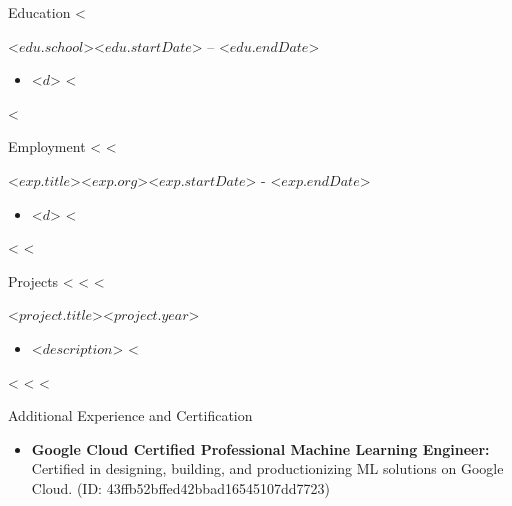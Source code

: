 \documentclass[]{mcdowellcv}
\begin{document}
	\makeheader
	

	\begin{cvsection}{Education}
		<%
		\begin{cvsubsection}{<$ edu.school $>}{}{<$ edu.startDate $> -- <$ edu.endDate $>}
			\begin{itemize}
					<%
				\item <$ d $>
					<%
			\end{itemize}
		\end{cvsubsection}
		<%
	\end{cvsection}

	\begin{cvsection}{Employment}
		<%
		<%
		\begin{cvsubsection}{<$ exp.title $>}{<$ exp.org $>}{<$ exp.startDate $> - <$ exp.endDate $>}
			\begin{itemize}
			<%
				\item <$ d $>
			<%
			\end{itemize}
		\end{cvsubsection}
		<%
		<%
	\end{cvsection}
		
    \begin{cvsection}{Projects}
	<%
	<%
	<%
        \begin{cvsubsection}{<$ project.title $>}{}{<$ project.year $>}
            \begin{itemize}
		<%
		\item  <$ description $>
		<%
            \end{itemize}
        \end{cvsubsection}
	<%
	<%
	<%
	\end{cvsection}

	\begin{cvsection}{Additional Experience and Certification}
		\begin{cvsubsection}{}{}{}	
			\begin{itemize}
				\item \textbf{Google Cloud Certified Professional Machine Learning Engineer:} Certified in designing, building, and productionizing ML solutions on Google Cloud. (ID: 43ffb52bffed42bbad16545107dd7723)
			\end{itemize}
		\end{cvsubsection}
	\end{cvsection}
	
\end{document}
